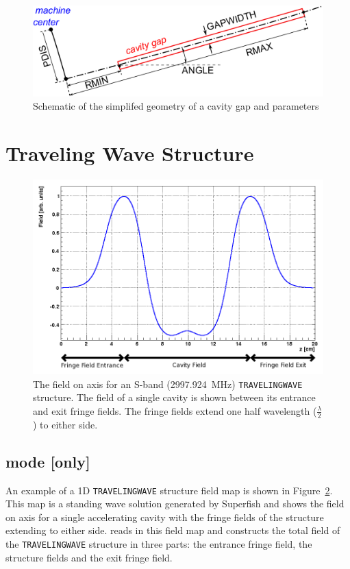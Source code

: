 \begin{figure}[hbt]
  \centering\includegraphics[scale=0.6]{./figures/cyclotron/Cavity.pdf}
  \caption{Schematic of the simplifed geometry of a cavity gap and parameters}
  \label{figure_Cyclotron_cavity}
\end{figure}


\section{Traveling Wave Structure}
\label{sec:travelingwave}

\begin{figure}[hbt]
  \centering\includegraphics[scale=0.6]{./figures/traveling-wave-structure/FINSB-RAC-field.png}
  \caption{The field on axis for an S-band (2997.924~MHz) \texttt{TRAVELINGWAVE} structure.
    The field of a single cavity is shown between its entrance and exit fringe fields.
    The fringe fields extend one half wavelength ($\frac{\lambda}{2}$) to either side.}
  \label{figure_FINSB-RAC-field}
\end{figure}

\subsection{\opalt mode [only]}
An example of a 1D \texttt{TRAVELINGWAVE} structure field map is shown in Figure~\ref{figure_FINSB-RAC-field}.
This map is a standing wave solution generated by Superfish and shows the field on axis for a single accelerating cavity with
the fringe fields of the structure extending to either side. \opalt reads in this field map and constructs the total field of the
\texttt{TRAVELINGWAVE} structure in three parts: the entrance fringe field, the structure fields and the exit fringe field.

